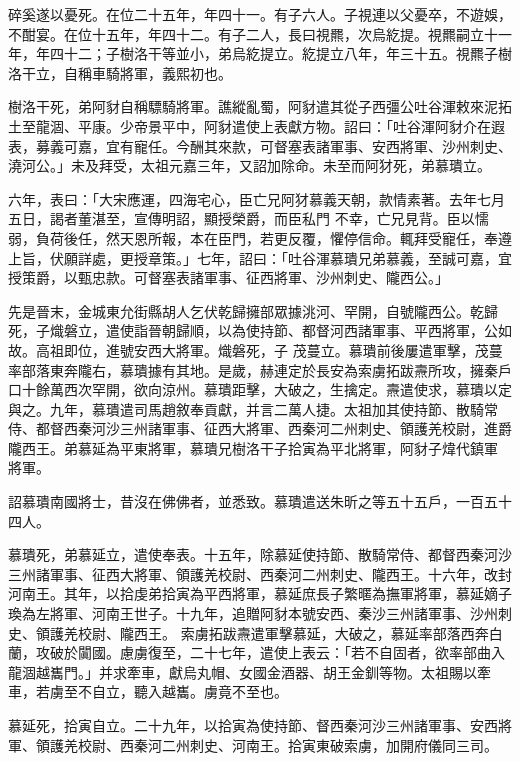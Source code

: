 \begin{pinyinscope}
 碎奚遂以憂死。在位二十五年，年四十一。有子六人。子視連以父憂卒，不遊娛，不酣宴。在位十五年，年四十二。有子二人，長曰視羆，次烏紇提。視羆嗣立十一年，年四十二；子樹洛干等並小，弟烏紇提立。紇提立八年，年三十五。視羆子樹洛干立，自稱車騎將軍，義熙初也。



 樹洛干死，弟阿豺自稱驃騎將軍。譙縱亂蜀，阿豺遣其從子西彊公吐谷渾敕來泥拓土至龍涸、平康。少帝景平中，阿豺遣使上表獻方物。詔曰：「吐谷渾阿豺介在遐表，募義可嘉，宜有寵任。今酬其來款，可督塞表諸軍事、安西將軍、沙州刺史、澆河公。」未及拜受，太祖元嘉三年，又詔加除命。未至而阿犲死，弟慕璝立。



 六年，表曰：「大宋應運，四海宅心，臣亡兄阿犲慕義天朝，款情素著。去年七月五日，謁者董湛至，宣傳明詔，顯授榮爵，而臣私門
 不幸，亡兄見背。臣以懦弱，負荷後任，然天恩所報，本在臣門，若更反覆，懼停信命。輒拜受寵任，奉遵上旨，伏願詳處，更授章策。」七年，詔曰：「吐谷渾慕璝兄弟慕義，至誠可嘉，宜授策爵，以甄忠款。可督塞表諸軍事、征西將軍、沙州刺史、隴西公。」



 先是晉末，金城東允街縣胡人乞伏乾歸擁部眾據洮河、罕開，自號隴西公。乾歸死，子熾磐立，遣使詣晉朝歸順，以為使持節、都督河西諸軍事、平西將軍，公如故。高祖即位，進號安西大將軍。熾磐死，子
 茂蔓立。慕璝前後屢遣軍擊，茂蔓率部落東奔隴右，慕璝據有其地。是歲，赫連定於長安為索虜拓跋燾所攻，擁秦戶口十餘萬西次罕開，欲向涼州。慕璝距擊，大破之，生擒定。燾遣使求，慕璝以定與之。九年，慕璝遣司馬趙敘奉貢獻，并言二萬人捷。太祖加其使持節、散騎常侍、都督西秦河沙三州諸軍事、征西大將軍、西秦河二州刺史、領護羌校尉，進爵隴西王。弟慕延為平東將軍，慕璝兄樹洛干子拾寅為平北將軍，阿豺子煒代鎮軍
 將軍。



 詔慕璝南國將士，昔沒在佛佛者，並悉致。慕璝遣送朱昕之等五十五戶，一百五十四人。



 慕璝死，弟慕延立，遣使奉表。十五年，除慕延使持節、散騎常侍、都督西秦河沙三州諸軍事、征西大將軍、領護羌校尉、西秦河二州刺史、隴西王。十六年，改封河南王。其年，以拾虔弟拾寅為平西將軍，慕延庶長子繁暱為撫軍將軍，慕延嫡子瑍為左將軍、河南王世子。十九年，追贈阿豺本號安西、秦沙三州諸軍事、沙州刺史、領護羌校尉、隴西王。
 索虜拓跋燾遣軍擊慕延，大破之，慕延率部落西奔白蘭，攻破於闐國。慮虜復至，二十七年，遣使上表云：「若不自固者，欲率部曲入龍涸越巂門。」并求牽車，獻烏丸帽、女國金酒器、胡王金釧等物。太祖賜以牽車，若虜至不自立，聽入越巂。虜竟不至也。



 慕延死，拾寅自立。二十九年，以拾寅為使持節、督西秦河沙三州諸軍事、安西將軍、領護羌校尉、西秦河二州刺史、河南王。拾寅東破索虜，加開府儀同三司。




\end{pinyinscope}

